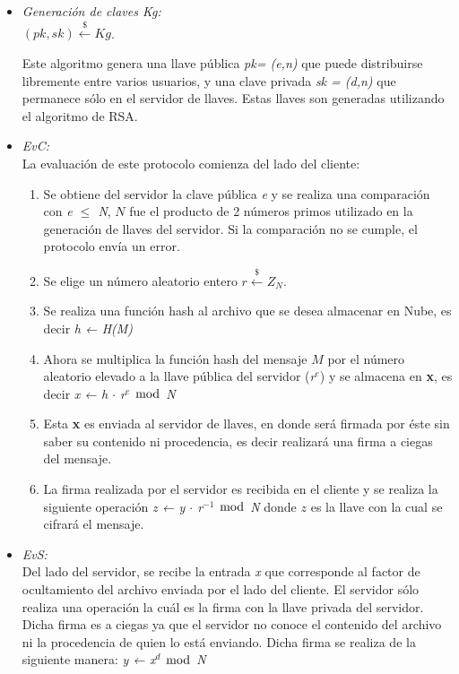 \begin{itemize}
\item \textit{Generación de claves Kg: } \\

$(pk, sk) \stackrel{ \$ }{\longleftarrow} Kg$. 

Este algoritmo genera una llave pública \textit{pk= (e,n)} que puede distribuirse libremente entre varios usuarios, y una clave privada \textit{sk = (d,n)} que permanece sólo en el servidor de llaves. Estas llaves son generadas utilizando el algoritmo de RSA.

\item \textit{EvC: }\\ 
La evaluación de este protocolo comienza del lado del cliente: 
\begin {enumerate}
\item Se obtiene del servidor la clave pública \textit{e} y se realiza una comparación con \textit{e $\leq$ N}, $N$ fue el producto de 2 números primos utilizado en la generación de llaves del servidor. Si la comparación no se cumple, el protocolo envía un error.
\item Se elige un número aleatorio entero $r \stackrel{ \$ }{\longleftarrow} Z_{N}$.
\item Se realiza una función hash al archivo que se desea almacenar en Nube, es decir \textit{h ← H(M)} 
\item Ahora se multiplica la función hash del mensaje $M$ por el número aleatorio elevado a la llave pública del servidor (\textit{r$^e$}) y se almacena en \textbf{x}, es decir \textit{x ← h $\cdot$ r$^e$ $\bmod$ N}
\item Esta \textbf{x} es enviada al servidor de llaves, en donde será firmada por éste sin saber su contenido ni procedencia, es decir realizará una firma a ciegas del mensaje.
\item La firma realizada por el servidor es recibida en el cliente y se realiza la siguiente operación \hspace{2cm} \textit{z ← y $\cdot$ r$^{-1}$ $\bmod$ N} donde $z$ es la llave con la cual se cifrará el mensaje.


\end{enumerate}
\item \textit{EvS: }\\ 
Del lado del servidor, se recibe la entrada \textit{x} que corresponde al factor de ocultamiento del archivo enviada por el lado del cliente. El servidor sólo realiza una operación la cuál es la firma con la llave privada del servidor. Dicha firma es a ciegas ya que el servidor no conoce el contenido del archivo ni la procedencia de quien lo está enviando. Dicha firma se realiza de la siguiente manera: \hspace{2cm} \textit{y ← x$^d$ $\bmod$ N}



\end{itemize}
